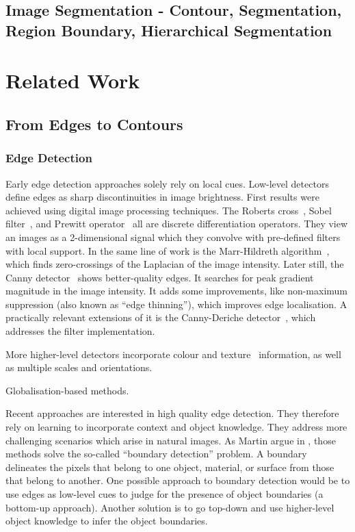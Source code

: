 \subsection{Image Segmentation - Contour, Segmentation, Region Boundary, Hierarchical Segmentation}
\section{Related Work}
\subsection{From Edges to Contours}
\subsubsection{Edge Detection}
Early edge detection approaches solely rely on local cues. Low-level detectors define edges as sharp discontinuities in image brightness. First results were achieved using digital image processing techniques. The Roberts cross~\cite{roberts1963machine}, Sobel filter~\cite{sobel19683x3}, and Prewitt operator~\cite{prewitt1970object} all are discrete differentiation operators. %
They view an images as a 2-dimensional signal which they convolve with pre-defined filters with local support. In the same line of work is the Marr-Hildreth algorithm~\cite{marr1980theory}, which finds zero-crossings of the Laplacian of the image intensity. Later still, the Canny detector~\cite{canny1986computational} shows better-quality edges. It searches for peak gradient magnitude in the image intensity. It adds some improvements, like non-maximum suppression (also known as ``edge thinning''), which improves edge localisation. A practically relevant extensions of it is the Canny-Deriche detector~\cite{deriche1987using}, which addresses the filter implementation.

More higher-level detectors incorporate colour and texture~\cite{rubner1996coalescing,will2000learning} information, as well as multiple scales and orientations.

Globalisation-based methods.

Recent approaches are interested in high quality edge detection. They therefore rely on learning to incorporate context and object knowledge. They address more challenging scenarios which arise in natural images. As Martin \etal argue in \cite{martin2004learning}, those methods solve the so-called ``boundary detection'' problem. A boundary delineates the pixels that belong to one object, material, or surface from those that belong to another. One possible approach to boundary detection would be to use edges as low-level cues to judge for the presence of object boundaries (a bottom-up approach). Another solution is to go top-down and use higher-level object knowledge to infer the object boundaries.

